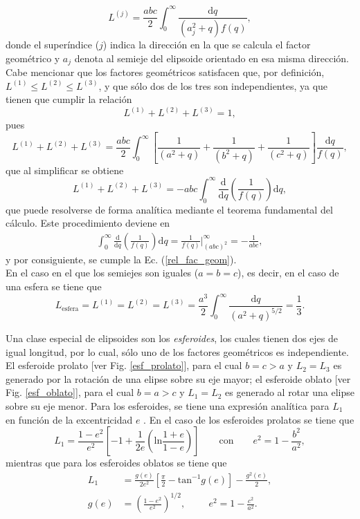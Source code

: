 \begin{equation}
    L^{(j)}=\frac{abc}{2}\int_0^{\infty}\frac{\text{d}q}{(a_j^2+q)f(q)},
\end{equation}
donde el superíndice ($j$) indica la dirección en la que se calcula el factor geométrico y $a_j$ denota al semieje del elipsoide orientado en esa misma dirección. Cabe mencionar que los factores geométricos  satisfacen que, por definición, $L^{(1)}\leq L^{(2)}\leq L^{(3)}$, y que sólo dos de los tres son independientes, ya que tienen que cumplir la relación 
\begin{equation}
    L^{(1)}+L^{(2)}+L^{(3)}=1,
    \label{rel_fac_geom}
\end{equation}
pues
\begin{equation*}
	L^{(1)}+L^{(2)}+L^{(3)}=\frac{abc}{2}\int_0^{\infty}\left[\frac{1}{(a^2+q)}+\frac{1}{(b^2+q)}+\frac{1}{(c^2+q)}\right]\frac{\text{d}q}{f(q)},
\end{equation*}
que al simplificar se obtiene
$$L^{(1)}+L^{(2)}+L^{(3)}=-abc\int_0^{\infty}\frac{\text{d}}{\text{d}q}\left(\frac{1}{f(q)}\right)\text{d}q,$$
que puede resolverse de forma analítica mediante el teorema fundamental del cálculo. Este procedimiento deviene en
\begin{align*}
	\int_0^{\infty}\frac{\text{d}}{\text{d}q}\left(\frac{1}{f(q)}\right)\text{d}q=\frac{1}{f(q)}\Big|_{(abc)^2}^{\infty}=-\frac{1}{abc},
\end{align*}
y por consiguiente, se cumple la Ec. (\ref{rel_fac_geom}).\\

\noindent En el caso en el que los semiejes son iguales ($a=b=c$), es decir, en el caso de una esfera se tiene que
\begin{equation*}
    L_{\text{esfera}}=L^{(1)}=L^{(2)}=L^{(3)}=\frac{a^3}{2}\int_0^{\infty}\frac{\text{d}q}{(a^2+q)^{5/2}}=\frac{1}{3}.
\end{equation*}

Una clase especial de elipsoides son los \textit{esferoides}, los cuales tienen dos ejes de igual longitud, por lo cual, sólo uno de los factores geométricos es independiente. El esferoide prolato [ver Fig. \ref{esf_prolato}], para el cual $b=c>a$ y $L_2=L_3$ es generado por la rotación de una elipse sobre su eje mayor; el esferoide oblato [ver Fig. \ref{esf_oblato}], para el cual $b=a>c$ y $L_1=L_2$ es generado al rotar una elipse sobre su eje menor. Para los esferoides, se tiene una expresión analítica para $L_1$ en función de la excentricidad $e$ \cite{Bohren}. En el caso de los esferoides prolatos se tiene que
\begin{equation}
	L_1=\frac{1-e^2}{e^2}\left[-1+\frac{1}{2e}\left(\text{ln}\frac{1+e}{1-e}\right)\right]\qquad\text{con}\qquad e^2=1-\frac{b^2}{a^2},
\end{equation}
mientras que para los esferoides oblatos se tiene que
    \begin{align}
        L_1&=\frac{g(e)}{2e^2}\left[\frac{\pi}{2}-\mbox{tan}^{-1}g(e)\right]-\frac{g^2(e)}{2},\\
        g(e)&=\left(\frac{1-e^2}{e^2}\right)^{1/2},\hspace{1cm}e^2=1-\frac{c^2}{a^2}.
    \end{align}

